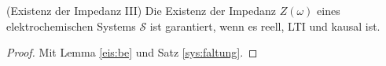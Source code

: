                                                                                                                                                                                                                                                                                                      \begin{satz}\label{eis:ex3}(Existenz der Impedanz III)
                                                                                                                                                                                                                                                                                                    Die Existenz der Impedanz $Z(\omega)$ eines elektrochemischen Systems $\mathscr{S}$ ist garantiert, wenn es reell, LTI und kausal ist. 
                                                                                                                                                                                                                                                                                                    \begin{proof}
                                                                                                                                                                                                                                                                                                    Mit Lemma \ref{eis:be} und Satz \ref{sys:faltung}.
                                                                                                                                                                                                                                                                                                 
\end{proof}                                                                                                                                                                                                                                                                                                                                                                                                                                                                                                                                                                                                                                                                                                                                                                                                                                                                                                         
                                                                                                                                                                                                                                                                                                      \end{satz}
